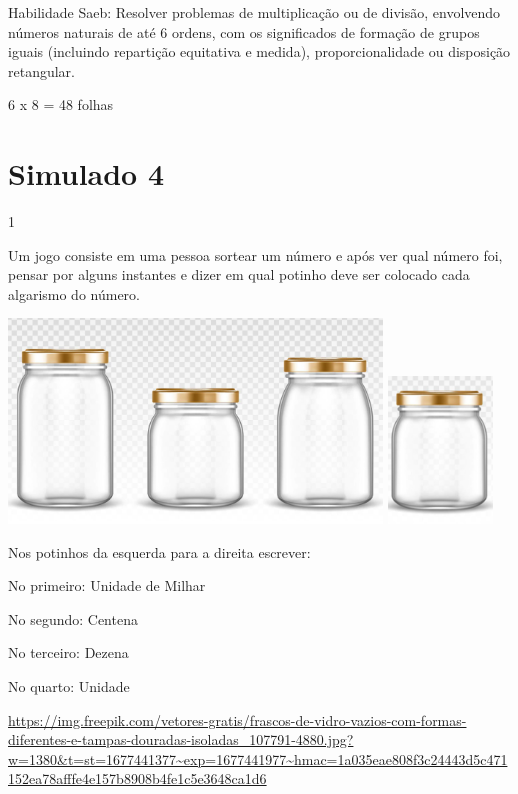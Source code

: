 \begin{escolha}
{\begin{escolha}
{Habilidade Saeb: Resolver problemas de multiplicação ou de divisão,
envolvendo números naturais de até 6 ordens, com os significados de
formação de grupos iguais (incluindo repartição equitativa e medida),
proporcionalidade ou disposição retangular.

6 x 8 = 48 folhas

\chapter{Simulado 4}

\num{1}

Um jogo consiste em uma pessoa sortear um número e após ver qual número
foi, pensar por alguns instantes e dizer em qual potinho deve ser
colocado cada algarismo do número.

\includegraphics[width=3.90833in,height=2.14168in]{media/image129.png}
\includegraphics[width=1.10010in,height=1.54180in]{media/image130.png}

Nos potinhos da esquerda para a direita escrever:

No primeiro: Unidade de Milhar

No segundo: Centena

No terceiro: Dezena

No quarto: Unidade

\url{https://img.freepik.com/vetores-gratis/frascos-de-vidro-vazios-com-formas-diferentes-e-tampas-douradas-isoladas_107791-4880.jpg?w=1380\&t=st=1677441377~exp=1677441977~hmac=1a035eae808f3c24443d5c471152ea78afffe4e157b8908b4fe1c5e3648ca1d6}

}
\end{escolha}}
\end{escolha}
